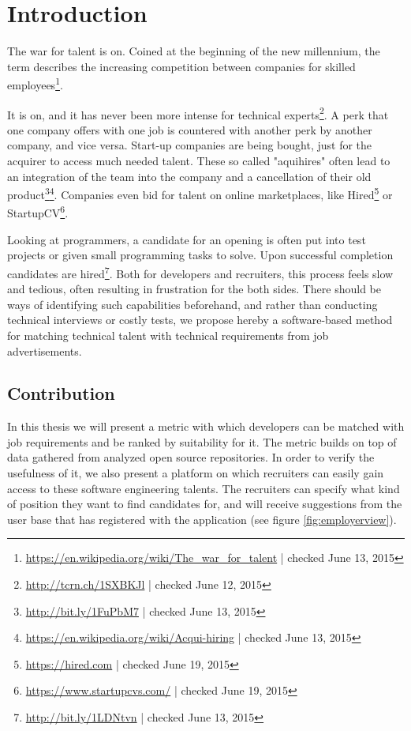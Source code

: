 \chapter{Introduction}\label{ch:introduction}
The war for talent is on. Coined at the beginning of the new millennium, the term describes the increasing competition between companies for skilled employees\footnote{\url{https://en.wikipedia.org/wiki/The_war_for_talent} | checked June 13, 2015}.

It is on, and it has never been more intense for technical experts\footnote{\url{http://tcrn.ch/1SXBKJl} | checked June 12, 2015}. A perk that one company offers with one job is countered with another perk by another company, and vice versa. Start-up companies are being bought, just for the acquirer to access much needed talent. These so called "aquihires" often lead to an integration of the team into the company and a cancellation of their old product\footnote{\url{http://bit.ly/1FuPbM7} | checked June 13, 2015}\footnote{\url{https://en.wikipedia.org/wiki/Acqui-hiring} | checked June 13, 2015}. Companies even bid for talent on online marketplaces, like Hired\footnote{\url{https://hired.com} | checked June 19, 2015} or StartupCV\footnote{\url{https://www.startupcvs.com/} | checked June 19, 2015}.


Looking at programmers, a candidate for an opening is often put into test projects or given small programming tasks to solve. Upon successful completion candidates are hired\footnote{\url{http://bit.ly/1LDNtvn} | checked June 13, 2015}. Both for developers and recruiters, this process feels slow and tedious, often resulting in frustration for the both sides. There should be ways of identifying such capabilities beforehand, and rather than conducting technical interviews or costly tests, we propose hereby a software-based method for matching technical talent with technical requirements from job advertisements.

\section{Contribution}
In this thesis we will present a metric with which developers can be matched with job requirements and be ranked by suitability for it. The metric builds on top of data gathered from analyzed open source repositories. In order to verify the usefulness of it, we also present a platform on which recruiters can easily gain access to these software engineering talents. The recruiters can specify what kind of position they want to find candidates for, and will receive suggestions from the user base that has registered with the application (see figure \ref{fig:employerview}).

